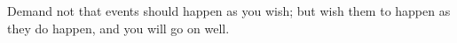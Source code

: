 Demand not that  events should happen as  you wish; but wish them  to happen as
they do happen, and you will go on well.
